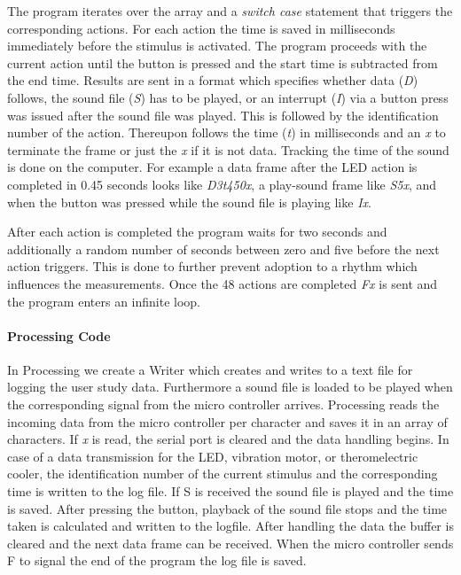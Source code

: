 The program iterates over the array and a \emph{switch case} statement that triggers the corresponding actions.
For each action the time is saved in milliseconds immediately before the stimulus is activated.
The program proceeds with the current action until the button is pressed and the start time is subtracted from the end time.
Results are sent in a format which specifies whether data (\emph{D}) follows, the sound file (\emph{S}) has to be played, or an interrupt (\emph{I}) via a button press was issued after the sound file was played. 
This is followed by the identification number of the action.
Thereupon follows the time (\emph{t}) in milliseconds and an \emph{x} to terminate the frame or just the \emph{x} if it is not data.
Tracking the time of the sound is done on the computer.
For example a data frame after the LED action is completed in 0.45 seconds looks like \emph{D3t450x}, a play-sound frame like \emph{S5x}, and when the button was pressed while the sound file is playing like \emph{Ix}.

After each action is completed the program waits for two seconds and additionally a random number of seconds between zero and five before the next action triggers.
This is done to further prevent adoption to a rhythm which influences the measurements.
Once the 48 actions are completed \emph{Fx} is sent and the program enters an infinite loop.

\paragraph{Processing Code}
In Processing we create a Writer which creates and writes to a text file for logging the user study data.
Furthermore a sound file is loaded to be played when the corresponding signal from the micro controller arrives. 
Processing reads the incoming data from the micro controller per character and saves it in an array of characters. 
If \emph{x} is read, the serial port is cleared and the data handling begins. 
In case of a data transmission for the LED, vibration motor, or theromelectric cooler, the identification number of the current stimulus and the corresponding time is written to the log file. 
If S is received the sound file is played and the time is saved. 
After pressing the button, playback of the sound file stops and the time taken is calculated and written to the logfile. 
After handling the data the buffer is cleared and the next data frame can be received. 
When the micro controller sends F to signal the end of the program the log file is saved.

